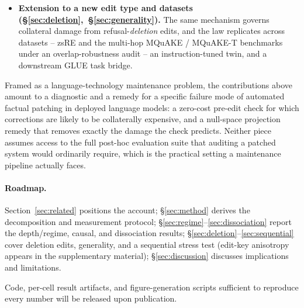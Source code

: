 \begin{itemize}
  generalizes at full strength to an instruction-tuned twin and
  sign-agnostically to a second architecture (both three-seed), and
  monotonically at 20B (single-seed),
  while the signed coupling attenuates at 8B, which we report as
  claim-tightening rather than a positive confirmation at scale.
\item \textbf{Extension to a new edit type and datasets
  (\S\ref{sec:deletion},~\S\ref{sec:generality}).} The same mechanism governs
  collateral damage from refusal-\emph{deletion} edits, and the law replicates
  across datasets -- zsRE and the multi-hop MQuAKE / MQuAKE-T benchmarks under
  an overlap-robustness audit -- an instruction-tuned twin, and a downstream
  GLUE task bridge.
\end{itemize}

\iftaslp
Framed as a language-technology maintenance problem, the contributions above
amount to a diagnostic and a remedy for a specific failure mode of automated
factual patching in deployed language models: a zero-cost pre-edit check for
which corrections are likely to be collaterally expensive, and a null-space
projection remedy that removes exactly the damage the check predicts. Neither
piece assumes access to the full post-hoc evaluation suite that auditing a
patched system would ordinarily require, which is the practical setting a
maintenance pipeline actually faces.
\fi

\paragraph{Roadmap.} Section~\ref{sec:related} positions the account;
\S\ref{sec:method} derives the decomposition and measurement protocol;
\S\ref{sec:regime}--\ref{sec:dissociation} report the depth/regime, causal,
and dissociation results; \S\ref{sec:deletion}--\ref{sec:sequential} cover
deletion edits, generality, and a sequential stress test (edit-key anisotropy
appears in the supplementary material); \S\ref{sec:discussion} discusses
implications and limitations.

Code, per-cell result artifacts, and figure-generation scripts sufficient to
reproduce every number will be released upon publication.

